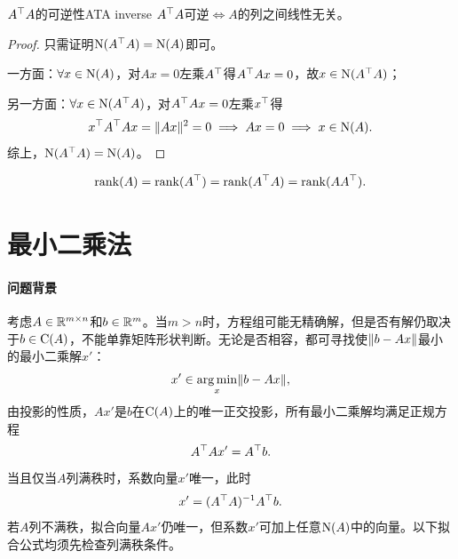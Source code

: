 \begin{theorem}{$A^\top A$的可逆性}{ATA inverse}
	$A^\top A$可逆$\iff A$的列之间线性无关。
\end{theorem}
\begin{proof}
	只需证明$\operatorname{N}(A^\top A) = \operatorname{N}(A)$即可。
	
	一方面：$\forall x \in \operatorname{N}(A)$，对$Ax = 0$左乘$A^\top$得$A^\top Ax = 0$，故$x \in \operatorname{N}(A^\top A)$；
	
	另一方面：$\forall x \in \operatorname{N}(A^\top A)$，对$A^\top Ax = 0$左乘$x^\top$得
	\[
		x^\top A^\top Ax = \lVert Ax\rVert^2 = 0 \implies Ax = 0 \implies x \in \operatorname{N}(A).
	\]
	综上，$\operatorname{N}(A^\top A) = \operatorname{N}(A)$。
\end{proof}
\begin{corollary}
	\begin{equation}\label{eq:la-gram-rank}
		\operatorname{rank}(A) = \operatorname{rank}(A^\top) = \operatorname{rank}(A^\top A) = \operatorname{rank}(AA^\top).
	\end{equation}
\end{corollary}

\section{最小二乘法}

\paragraph{问题背景}
考虑$A \in \mathbb{R}^{m\times n}$和$b \in \mathbb{R}^m$。当$m > n$时，方程组可能无精确解，但是否有解仍取决于$b \in \operatorname{C}(A)$，不能单靠矩阵形状判断。无论是否相容，都可寻找使$\lVert b - Ax\rVert$最小的最小二乘解$x'$：
\begin{equation}\label{eq:la-least-squares-definition}
	x' \in \operatorname*{arg\,min}_x\lVert b - Ax\rVert,
\end{equation}
由投影的性质，$Ax'$是$b$在$\operatorname{C}(A)$上的唯一正交投影，所有最小二乘解均满足正规方程
\begin{equation}\label{eq:la-least-squares-normal-equations}
 A^\top Ax' = A^\top b.
\end{equation}
当且仅当$A$列满秩时，系数向量$x'$唯一，此时
\begin{equation}
	x' = (A^\top A)^{-1} A^\top b.
\end{equation}
若$A$列不满秩，拟合向量$Ax'$仍唯一，但系数$x'$可加上任意$\operatorname{N}(A)$中的向量。以下拟合公式均须先检查列满秩条件。

